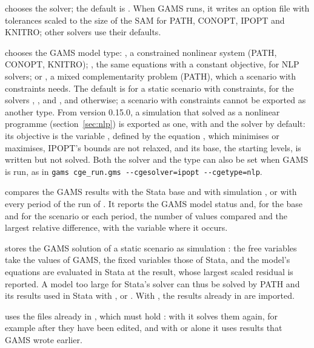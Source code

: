 \begin{optdesc}
\item[\optarg{}{solver}{name}] chooses the solver; the default is .
When GAMS runs, it writes an option file with tolerances scaled to the size
of the SAM for PATH, CONOPT, IPOPT and KNITRO; other solvers use their
defaults.

\item[\optarg{}{type}{name}] chooses the GAMS model type: , a
constrained nonlinear system (PATH, CONOPT, KNITRO); , the same
equations with a constant objective, for NLP solvers; or , a mixed
complementarity problem (PATH), which a scenario with constraints needs. The
default is  for a static scenario with constraints,  for
the solvers , ,  and , and
 otherwise; a scenario with constraints cannot be exported as
another type. From version 0.15.0, a simulation that 
solved as a nonlinear programme (section~\ref{sec:nlp}) is exported as one,
with  and the solver  by default: its objective is
the variable , defined by the equation , which
 minimises or maximises, IPOPT's bounds are not
relaxed, and its base, the starting levels, is written but not solved. Both
the solver and the type can also be set when GAMS is run, as in
\texttt{gams cge\_run.gms -{}-cgesolver=ipopt -{}-cgetype=nlp}.

\item[\opt{}{compare}] compares the GAMS results with the Stata base and with
simulation , or with every period of the run of .
It reports the GAMS model status and, for the base and for the scenario or
each period, the number of values compared and the largest relative
difference, with the variable where it occurs.

\item[\optarg{imp}{ort}{name}] stores the GAMS solution of a static scenario
as simulation : the free variables take the values of GAMS, the
fixed variables those of Stata, and the model's equations are evaluated in
Stata at the result, whose largest scaled residual is reported. A model too
large for Stata's solver can thus be solved by PATH and its results used in
Stata with ,  or .
With , the results already in  are imported.

\item[\opt{}{noexport}] uses the files already in , which must
hold : with  it solves them again, for example
after they have been edited, and with  or  alone
it uses results that GAMS wrote earlier.
\end{optdesc}

